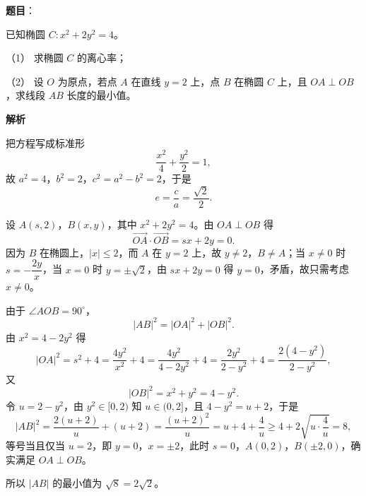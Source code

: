 \begin{answer}

\textbf{题目}：

已知椭圆 $C:x^2+2y^2=4$。

（1） 求椭圆 $C$ 的离心率；

（2） 设 $O$ 为原点，若点 $A$ 在直线 $y=2$ 上，点 $B$ 在椭圆 $C$ 上，且 $OA\perp OB$，求线段 $AB$ 长度的最小值。

\textbf{解析}


把方程写成标准形
\nopagebreak[4]
\[\frac{x^2}4+\frac{y^2}2=1,\]
故 $a^2=4$，$b^2=2$，$c^2=a^2-b^2=2$，于是
\nopagebreak[4]
\[e=\frac ca=\frac{\sqrt2}{2} .\]


设 $A(s,2)$，$B(x,y)$，其中 $x^2+2y^2=4$。由 $OA\perp OB$ 得
\nopagebreak[4]
\[\overrightarrow{OA}\cdot\overrightarrow{OB}=sx+2y=0 .\]
因为 $B$ 在椭圆上，$|x|\leqslant2$，而 $A$ 在 $y=2$ 上，故 $y\neq2$，$B\neq A$；当 $x\neq0$ 时 $s=-\dfrac{2y}{x}$，当 $x=0$ 时 $y=\pm\sqrt2$，由 $sx+2y=0$ 得 $y=0$，矛盾，故只需考虑 $x\neq0$。

由于 $\angle AOB=90^\circ$，
\nopagebreak[4]
\[|AB|^2=|OA|^2+|OB|^2 .\]
由 $x^2=4-2y^2$ 得
\nopagebreak[4]
\[|OA|^2=s^2+4=\frac{4y^2}{x^2}+4=\frac{4y^2}{4-2y^2}+4
=\frac{2y^2}{2-y^2}+4=\frac{2(4-y^2)}{2-y^2},\]
又
\nopagebreak[4]
\[|OB|^2=x^2+y^2=4-y^2 .\]
令 $u=2-y^2$，由 $y^2\in[0,2)$ 知 $u\in(0,2]$，且 $4-y^2=u+2$，于是
\nopagebreak[4]
\[|AB|^2=\frac{2(u+2)}{u}+(u+2)=\frac{(u+2)^2}{u}=u+4+\frac4u\geqslant 4+2\sqrt{u\cdot\frac4u}=8,\]
等号当且仅当 $u=2$，即 $y=0$，$x=\pm2$，此时 $s=0$，$A(0,2)$，$B(\pm2,0)$，确实满足 $OA\perp OB$。

所以 $|AB|$ 的最小值为 $\sqrt8=2\sqrt2$。


\gkanswer{答案（2）：$2\sqrt2$。$|AB|^2=|OA|^2+|OB|^2=\dfrac{(u+2)^2}{u}\geqslant 8$，其中 $u=2-y^2\in(0,2]$，$u=2$ 时取等号。}

\end{answer}
